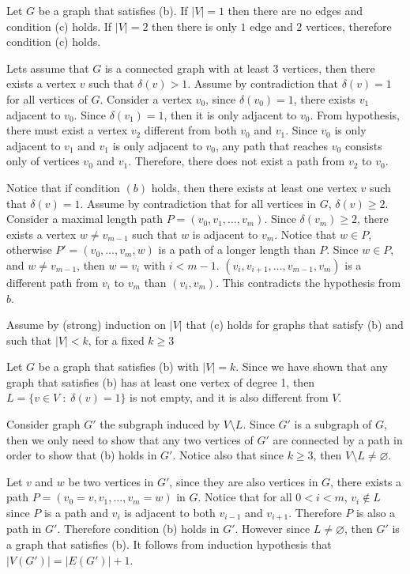 \begin{enumerate}
        Let $G$ be a graph that satisfies (b). If $\vert V \vert = 1$ then there are no edges and condition (c) holds. If $\vert V \vert = 2$ then there is only $1$ edge and $2$ vertices, therefore condition (c) holds.
        
        Lets assume that $G$ is a connected graph with at least $3$ vertices, then there exists a vertex $v$ such that $\delta(v) > 1$. Assume by contradiction that $\delta(v) = 1$ for all vertices of $G$. Consider a vertex $v_0$, since $\delta (v_0) = 1$, there exists $v_1$ adjacent to $v_0$. Since $\delta (v_1) = 1$, then it is only adjacent to $v_0$. From hypothesis, there must exist a vertex $v_2$ different from both $v_0$ and $v_1$. Since $v_0$ is only adjacent to $v_1$ and $v_1$ is only adjacent to $v_0$, any path that reaches $v_0$ consists only of vertices $v_0$ and $v_1$. Therefore, there does not exist a path from $v_2$ to $v_0$.
        
        Notice that if condition $(b)$ holds, then there exists at least one vertex $v$ such that $\delta (v) = 1$. Assume by contradiction that for all vertices in $G$, $\delta(v) \geq 2$. Consider a maximal length path $P = (v_0, v_1, \ldots, v_m)$. Since $\delta(v_m) \geq 2$, there exists a vertex $w \neq v_{m-1}$ such that $w$ is adjacent to $v_m$. Notice that $w \in P$, otherwise $P' = (v_0, \ldots, v_m, w)$ is a path of a longer length than $P$. Since $w \in P$, and $w \neq v_{m-1}$, then $w= v_i$ with $i< m-1$. $(v_i, v_{i+1}, \ldots, v_{m-1}, v_m)$ is a different path from $v_i$ to $v_m$ than $(v_i,v_m)$. This contradicts the hypothesis from $b$.
        
        Assume by (strong) induction on $\vert V \vert $ that (c) holds for graphs that satisfy (b) and such that $\vert V \vert < k$, for a fixed $k \geq 3$
        
        Let $G$ be a graph that satisfies (b) with $\vert V \vert = k $. Since we have shown that any graph that satisfies (b) has at least one vertex of degree 1, then $L = \{ v \in V \; : \; \delta(v)=1 \} $ is not empty, and it is also different from $V$.
        
        Consider graph $G'$ the subgraph induced by $V \setminus L$. Since $G'$ is a subgraph of $G$, then we only need to show that any two vertices of $G'$ are connected by a path in order to show that (b) holds in $G'$. Notice also that since $k \geq 3$, then $V\setminus L \neq \varnothing$.
        
        Let $v$ and $w$ be two vertices in $G'$, since they are also vertices in $G$, there exists a path $P = (v_0 = v, v_1, \ldots, v_m = w)$ in $G$. Notice that for all $0<i<m$, $v_i \notin L$ since $P$ is a path and $v_i$ is adjacent to both $v_{i-1}$ and $v_{i+1}$. Therefore $P$ is also a path in $G'$. Therefore condition (b) holds in $G'$. However since $L \neq \varnothing$, then $G'$ is a graph that satisfies (b). It follows from induction hypothesis that $\vert V(G')\vert = \vert E(G') \vert +1$.
        

\end{enumerate}
